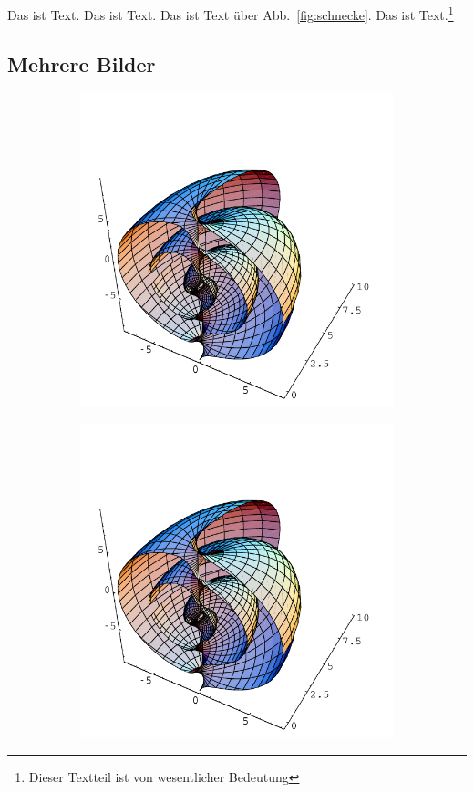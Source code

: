 \documentclass[12pt,DIV=15,BCOR=15mm,twoside,headsepline,abstract=true,listof=totoc,bibliography=totoc]{scrreprt}
\theoremstyle{remark}	%
\begin{document}
Das ist Text. Das ist Text. Das ist Text über Abb.~\ref{fig:schnecke}. Das ist Text.\footnote{Dieser Textteil
ist von wesentlicher Bedeutung}

\subsection{Mehrere Bilder}
\begin{figure}[h!t]
\centering
\begin{subfigure}{0.4\textwidth}
\includegraphics[width=\textwidth]{pics/SCHNECKE}
\label{fig:schnecke:a}
\end{subfigure}
\qquad
\begin{subfigure}{0.4\textwidth}
\includegraphics[width=\textwidth]{pics/SCHNECKE}

\end{subfigure}
\end{figure}
\end{document}
